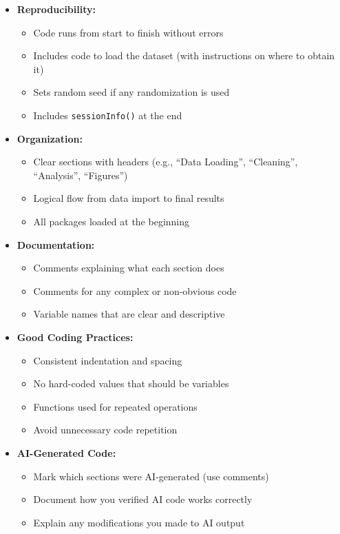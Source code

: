 \documentclass[11pt]{article}
\begin{document}
\begin{itemize}
\item \textbf{Reproducibility:}
  \begin{itemize}
  \item Code runs from start to finish without errors
  \item Includes code to load the dataset (with instructions on where to obtain it)
  \item Sets random seed if any randomization is used
  \item Includes \texttt{sessionInfo()} at the end
  \end{itemize}

\item \textbf{Organization:}
  \begin{itemize}
  \item Clear sections with headers (e.g., ``Data Loading'', ``Cleaning'', ``Analysis'', ``Figures'')
  \item Logical flow from data import to final results
  \item All packages loaded at the beginning
  \end{itemize}

\item \textbf{Documentation:}
  \begin{itemize}
  \item Comments explaining what each section does
  \item Comments for any complex or non-obvious code
  \item Variable names that are clear and descriptive
  \end{itemize}

\item \textbf{Good Coding Practices:}
  \begin{itemize}
  \item Consistent indentation and spacing
  \item No hard-coded values that should be variables
  \item Functions used for repeated operations
  \item Avoid unnecessary code repetition
  \end{itemize}

\item \textbf{AI-Generated Code:}
  \begin{itemize}
  \item \textcolor{aiblue}{Mark which sections were AI-generated (use comments)}
  \item \textcolor{aiblue}{Document how you verified AI code works correctly}
  \item \textcolor{aiblue}{Explain any modifications you made to AI output}
  \end{itemize}
\end{itemize}
\end{document}
